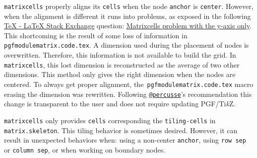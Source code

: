 \documentclass{scrartcl}
\newcommand\code\texttt
\newcommand{\TikZ}{Ti\textit{k}Z\xspace}
\begin{document}
\code{matrixcells} properly aligns its \code{cells} when the node \code{anchor} is \code{center}.
However, when the alignment is different it runs into problems, as exposed in the following \href{http://tex.stackexchange.com}{\TeX{} - \LaTeX{} Stack Exchange} question: \href{http://tex.stackexchange.com/questions/128045/matrixcells-problem-with-the-y-axis-only}{Matrixcells problem with the y-axis only}.
This shortcoming is the result of some loss of information in \code{pgfmodulematrix.code.tex}.
A dimension used during the placement of nodes is overwritten.
Therefore, this information is not available to build the grid.
In \code{matrixcells}, this lost dimension is reconstructed as the average of two other dimensions.
This method only gives the right dimension when the nodes are centered.
To always get proper alignment, the~\code{pgfmodulematrix.code.tex} macro erasing the dimension was rewritten.
Following \href{http://tex.stackexchange.com/users/3235/percusse}{\code{@percusse}}'s recommendation this change is transparent to the user and does not require updating PGF/\TikZ.

\code{matrixcells} only provides \code{cells} corresponding the \code{tiling-cells} in \code{matrix.skeleton}.
This tiling behavior is sometimes desired.
However, it can result in unexpected behaviors when: using a non-center \code{anchor}, using \code{row sep} or \code{column sep}, or when working on boundary nodes.
\end{document}
